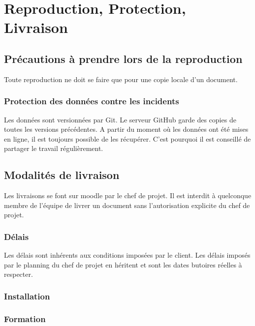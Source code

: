 \section{Reproduction, Protection, Livraison}

\subsection{Précautions à prendre lors de la reproduction}
Toute reproduction ne doit se faire que pour une copie locale d'un document.

\subsubsection{Protection des données contre les incidents}
Les données sont versionnées par Git. Le serveur GitHub garde des copies de toutes les versions précédentes.
A partir du moment où les données ont été mises en ligne, il est toujours possible de les récupérer.
C'est pourquoi il est conseillé de partager le travail régulièrement.

\subsection{Modalités de livraison}
Les livraisons se font sur moodle par le chef de projet.
Il est interdit à quelconque membre de l'équipe de livrer un document sans l'autorisation explicite du chef de projet.

\subsubsection{Délais}
Les délais sont inhérents aux conditions imposées par le client. Les délais imposés par le
planning du chef de projet en héritent et sont les dates butoires réelles à respecter. 

\subsubsection{Installation}


\subsubsection{Formation}

\pagebreak
